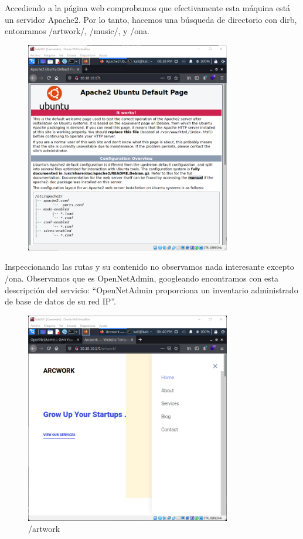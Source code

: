 \documentclass{article}
\begin{document}
Accediendo a la página web comprobamos que efectivamente esta máquina está un servidor Apache2. Por lo tanto, hacemos una búsqueda de directorio con dirb, entonramos /artwork/, /music/, y /ona.
\begin{figure}[h]
	\center
	\includegraphics[width=0.8\textwidth]{images/openadmin/2-paginaweb.png}
	\caption{}
\end{figure}

Inspeccionando las rutas y su contenido no observamos nada interesante excepto /ona. Observamos que es OpenNetAdmin, googleando encontramos con esta descripción del servicio: “OpenNetAdmin proporciona un inventario administrado de base de datos de su red IP”.
\begin{figure}[h]
	\center
	\includegraphics[width=0.8\textwidth]{images/openadmin/3-artwork.png}
	\caption{/artwork}
\end{figure}
\end{document}
